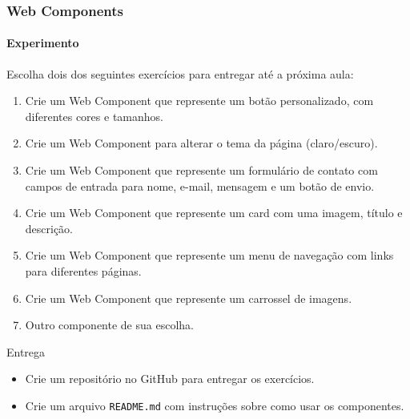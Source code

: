 \documentclass[
	9pt, %
	t, %
]{beamer}
\begin{document}
\begin{frame}
	\frametitle{Web Components}
	\framesubtitle{Experimento}

	Escolha dois dos seguintes exercícios para entregar até a próxima aula:

	\begin{enumerate}
		\item Crie um Web Component que represente um botão personalizado, com diferentes
		      cores e tamanhos.
		\item Crie um Web Component para alterar o tema da página (claro/escuro).
		\item Crie um Web Component que represente um formulário de contato com campos de
		      entrada para nome, e-mail, mensagem e um botão de envio.
		\item Crie um Web Component que represente um card com uma imagem, título e
		      descrição.
		\item Crie um Web Component que represente um menu de navegação com links para
		      diferentes páginas.
		\item Crie um Web Component que represente um carrossel de imagens.
		\item Outro componente de sua escolha.
	\end{enumerate}

	\begin{block}{Entrega}
		\begin{itemize}
			\item Crie um repositório no GitHub para entregar os exercícios.
			\item Crie um arquivo \texttt{README.md} com instruções sobre como usar os
			      componentes.
		\end{itemize}
	\end{block}

\end{frame}
\end{document}
